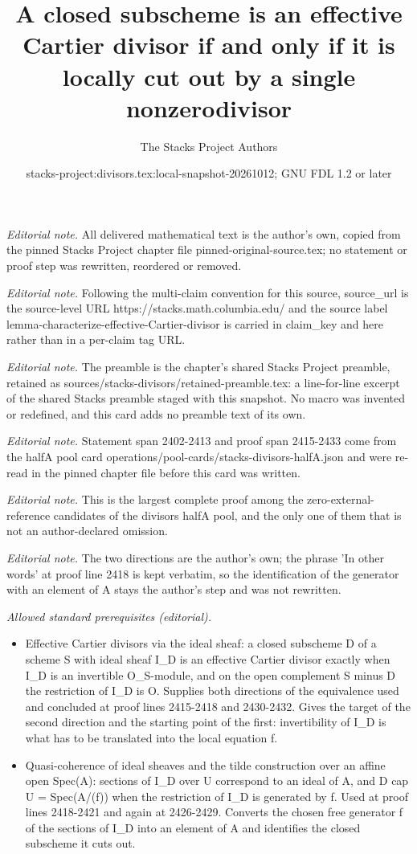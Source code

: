 \documentclass[10pt,a4paper]{amsart}
\title{A closed subscheme is an effective Cartier divisor if and only if it is locally cut out by a single nonzerodivisor}
\author{The Stacks Project Authors}
\date{stacks-project:divisors.tex:local-snapshot-20261012; GNU FDL 1.2 or later}
\theoremstyle{plain}
\theoremstyle{definition}
\theoremstyle{remark}
\numberwithin{equation}{subsection}
\begin{document}
\maketitle
\noindent\textit{Editorial note.} All delivered mathematical text is the author's own, copied from the pinned Stacks Project chapter file pinned-original-source.tex; no statement or proof step was rewritten, reordered or removed.\par\medskip
\noindent\textit{Editorial note.} Following the multi-claim convention for this source, source\_url is the source-level URL https://stacks.math.columbia.edu/ and the source label lemma-characterize-effective-Cartier-divisor is carried in claim\_key and here rather than in a per-claim tag URL.\par\medskip
\noindent\textit{Editorial note.} The preamble is the chapter's shared Stacks Project preamble, retained as sources/stacks-divisors/retained-preamble.tex: a line-for-line excerpt of the shared Stacks preamble staged with this snapshot. No macro was invented or redefined, and this card adds no preamble text of its own.\par\medskip
\noindent\textit{Editorial note.} Statement span 2402-2413 and proof span 2415-2433 come from the halfA pool card operations/pool-cards/stacks-divisors-halfA.json and were re-read in the pinned chapter file before this card was written.\par\medskip
\noindent\textit{Editorial note.} This is the largest complete proof among the zero-external-reference candidates of the divisors halfA pool, and the only one of them that is not an author-declared omission.\par\medskip
\noindent\textit{Editorial note.} The two directions are the author's own; the phrase 'In other words' at proof line 2418 is kept verbatim, so the identification of the generator with an element of A stays the author's step and was not rewritten.\par\medskip
\noindent\textit{Allowed standard prerequisites (editorial).}\begin{itemize}
\item Effective Cartier divisors via the ideal sheaf: a closed subscheme D of a scheme S with ideal sheaf I\_D is an effective Cartier divisor exactly when I\_D is an invertible O\_S-module, and on the open complement S minus D the restriction of I\_D is O. Supplies both directions of the equivalence used and concluded at proof lines 2415-2418 and 2430-2432. Gives the target of the second direction and the starting point of the first: invertibility of I\_D is what has to be translated into the local equation f.
\item Quasi-coherence of ideal sheaves and the tilde construction over an affine open Spec(A): sections of I\_D over U correspond to an ideal of A, and D cap U = Spec(A/(f)) when the restriction of I\_D is generated by f. Used at proof lines 2418-2421 and again at 2426-2429. Converts the chosen free generator f of the sections of I\_D into an element of A and identifies the closed subscheme it cuts out.
\end{itemize}\medskip
\end{document}

